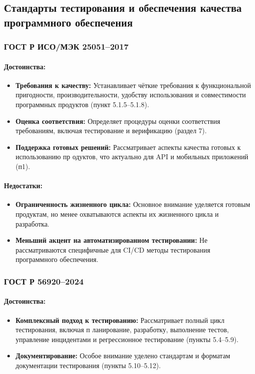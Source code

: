 \subsection{Стандарты тестирования и обеспечения качества программного обеспечения}


\subsubsection*{ГОСТ Р ИСО/МЭК 25051--2017}

\paragraph{Достоинства:}
\begin{itemize}
    \item \textbf{Требования к качеству:} Устанавливает чёткие требования к функциональной пригодности,
    производительности, удобству использования и совместимости программных продуктов (пункт 5.1.5--5.1.8).
    \item \textbf{Оценка соответствия:} Определяет процедуры оценки соответствия требованиям, включая тестирование и верификацию (раздел 7).
    \item \textbf{Поддержка готовых решений:} Рассматривает аспекты качества готовых к использованию пр
    одуктов, что актуально для API и мобильных приложений (п1).
\end{itemize}

\paragraph{Недостатки:}
\begin{itemize}
    \item \textbf{Ограниченность жизненного цикла:} Основное внимание уделяется готовым продуктам, но менее охватываются аспекты их жизненного цикла и разработка.
    \item \textbf{Меньший акцент на автоматизированном тестировании:} Не рассматриваются специфичные для CI/CD методы тестирования программного обеспечения.
\end{itemize}

\subsubsection*{ГОСТ Р 56920--2024}

\paragraph{Достоинства:}
\begin{itemize}
    \item \textbf{Комплексный подход к тестированию:} Рассматривает полный цикл тестирования, включая п
    ланирование, разработку, выполнение тестов, управление инцидентами и регрессионное тестирование (пункты 5.4--5.9).
    \item \textbf{Документирование:} Особое внимание уделено стандартам и форматам документации тестирования (пункты 5.10--5.12).
\end{itemize}

